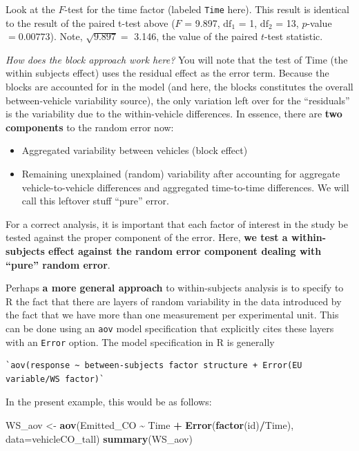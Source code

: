 \documentclass[
]{book}
\newenvironment{Shaded}{\begin{snugshade}}{\end{snugshade}}
\newcommand{\AttributeTok}[1]{\textcolor[rgb]{0.13,0.29,0.53}{#1}}
\newcommand{\FunctionTok}[1]{\textcolor[rgb]{0.13,0.29,0.53}{\textbf{#1}}}
\newcommand{\NormalTok}[1]{#1}
\newcommand{\OtherTok}[1]{\textcolor[rgb]{0.56,0.35,0.01}{#1}}
\newcommand{\SpecialCharTok}[1]{\textcolor[rgb]{0.81,0.36,0.00}{\textbf{#1}}}
\providecommand{\tightlist}{%
  \setlength{\itemsep}{0pt}\setlength{\parskip}{0pt}}
\begin{document}
Look at the \(F\)-test for the time factor (labeled \texttt{Time} here).
This result is identical to the result of the paired t-test above (\(F\) = 9.897, \(\textrm{df}_1\) = 1, \(\textrm{df}_2\) = 13, \(p\)-value \(= 0.00773\)).
Note, \(\sqrt{9.897} =\) 3.146, the value of the paired \(t\)-test statistic.

\emph{How does the block approach work here?} You will note that the test of Time (the within subjects effect) uses the residual effect as the error term.
Because the blocks are accounted for in the model (and here, the blocks constitutes the overall between-vehicle variability source), the only variation left over for the ``residuals'' is the variability due to the within-vehicle differences.
In essence, there are \textbf{two components} to the random error now:

\begin{itemize}
\tightlist
\item
  Aggregated variability between vehicles (block effect)
\item
  Remaining unexplained (random) variability after accounting for aggregate vehicle-to-vehicle differences and aggregated time-to-time differences. We will call this leftover stuff ``pure'' error.
\end{itemize}

For a correct analysis, it is important that each factor of interest in the study be tested against the proper component of the error. Here, \textbf{we test a within-subjects effect against the random error component dealing with ``pure'' random error}.

Perhaps \textbf{a more general approach} to within-subjects analysis is to specify to R the fact that there are layers of random variability in the data introduced by the fact that we have more than one measurement per experimental unit.
This can be done using an \texttt{aov} model specification that explicitly cites these layers with an \texttt{Error} option.
The model specification in R is generally

\begin{verbatim}
`aov(response ~ between-subjects factor structure + Error(EU variable/WS factor)`
\end{verbatim}

In the present example, this would be as follows:

\begin{Shaded}
\begin{Highlighting}[]
\NormalTok{WS\_aov }\OtherTok{\textless{}{-}} \FunctionTok{aov}\NormalTok{(Emitted\_CO }\SpecialCharTok{\textasciitilde{}}\NormalTok{ Time }\SpecialCharTok{+} \FunctionTok{Error}\NormalTok{(}\FunctionTok{factor}\NormalTok{(id)}\SpecialCharTok{/}\NormalTok{Time), }\AttributeTok{data=}\NormalTok{vehicleCO\_tall)}
\FunctionTok{summary}\NormalTok{(WS\_aov)}
\end{Highlighting}
\end{Shaded}
\end{document}
